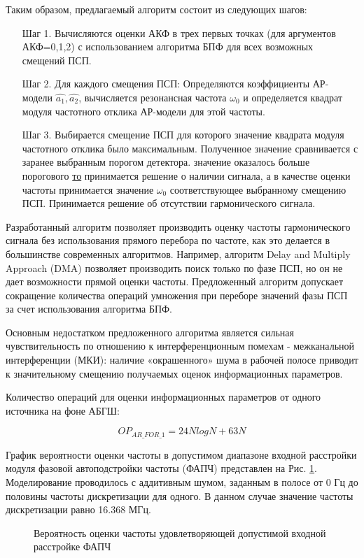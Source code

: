 Таким образом, предлагаемый алгоритм состоит из следующих шагов:

\begin{itemize}
\item[Шаг 1.] Вычисляются оценки  АКФ в трех первых точках (для аргументов АКФ=0,1,2)
	с использованием алгоритма БПФ для всех возможных смещений ПСП. 
\item[Шаг 2.] Для каждого смещения ПСП: 
	Определяются коэффициенты АР-модели ${\hat{a_1}, \hat{a_2}}$,
	вычисляется резонансная частота ${\omega_0}$
	и определяется квадрат модуля частотного отклика АР-модели для этой частоты. 
\item[Шаг 3.] Выбирается смещение ПСП для которого значение квадрата модуля частотного отклика было максимальным. Полученное значение сравнивается с заранее выбранным порогом детектора. 
	  значение оказалось больше порогового {\underline{то}} 
		принимается решение о наличии сигнала, а в качестве оценки
		частоты принимается значение ${\omega_0}$ соответствующее выбранному смещению ПСП. 
		Принимается решение об отсутствии гармонического сигнала.
\end{itemize}

Разработанный алгоритм позволяет производить оценку частоты гармонического сигнала без использования прямого перебора по частоте, как это делается в большинстве современных алгоритмов.
Например, алгоритм Delay and Multiply Approach (DMA) позволяет производить поиск только по фазе ПСП, но он не дает возможности прямой оценки частоты. 
Предложенный алгоритм допускает сокращение количества операций умножения при переборе значений фазы ПСП за счет использования алгоритма БПФ.

Основным недостатком предложенного алгоритма является сильная чувствительность по отношению к интерференционным помехам - межканальной интерференции (МКИ):
наличие «окрашенного» шума в рабочей полосе приводит к значительному смещению получаемых оценок информационных параметров.

Количество операций для оценки информационных параметров от одного источника на фоне АБГШ:
\begin{center}
\begin{equation}
	OP_{AR\_FOR\_1} = 24NlogN + 63N
\end{equation}
\end{center}

График вероятности оценки частоты в допустимом диапазоне входной расстройки модуля фазовой автоподстройки частоты (ФАПЧ) представлен на Рис.
\ref{pic:lpc_for_1_probability}. Моделирование проводилось с аддитивным шумом, заданным в полосе от 0 Гц до
половины частоты дискретизации для одного. В данном случае значение частоты дискретизации равно 16.368 МГц.
\begin{figure}[H]
\center{}
	\caption{Вероятность оценки частоты удовлетворяющей допустимой входной расстройке ФАПЧ}
	\label{pic:lpc_for_1_probability}
\end{figure}

